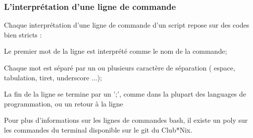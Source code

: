 \subsubsection{L'interprétation d'une ligne de commande}
Chaque interprétation d'une ligne de commande d'un script repose sur des codes bien stricts :
\begin{itemiz}
  \item Le premier mot de la ligne est interprété comme le nom de la commande;
  \item Chaque mot est séparé par un ou plusieurs caractère de séparation ( espace, tabulation, tiret, underscore ...);
  \item La fin de la ligne se termine par un ';', comme dans la plupart des languages de programmation, ou un retour à la ligne
\end{itemiz}

Pour plus d'informations sur les lignes de commandes bash, il existe un poly sur les commandes du terminal disponible sur le git du Club*Nix.
